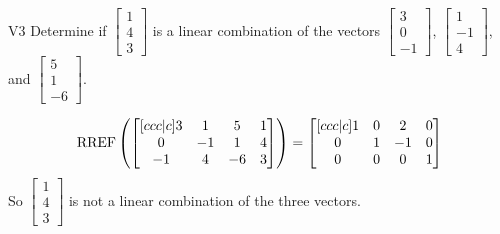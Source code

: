 \begin{problem}{V3} Determine if \(\begin{bmatrix} 1 \\ 4 \\ 3 \end{bmatrix}\) is a linear combination of the vectors \(\begin{bmatrix} 3 \\ 0 \\ -1 \end{bmatrix}\), \(\begin{bmatrix} 1 \\ -1 \\ 4 \end{bmatrix}\), and \(\begin{bmatrix} 5 \\ 1 \\  -6 \end{bmatrix}\).
\end{problem}
\begin{solution}
\[\operatorname{RREF}\left(\begin{bmatrix}[ccc|c] 3 & 1 & 5 & 1 \\ 0 & -1 & 1 & 4 \\ -1 & 4 & -6 & 3 \end{bmatrix} \right) = \begin{bmatrix}[ccc|c] 1 & 0 & 2 & 0 \\ 0 & 1 & -1 & 0 \\ 0 & 0 & 0 & 1 \end{bmatrix}\]
So \(\begin{bmatrix} 1 \\ 4 \\ 3 \end{bmatrix}\) is not a linear combination of the three vectors.
\end{solution}


